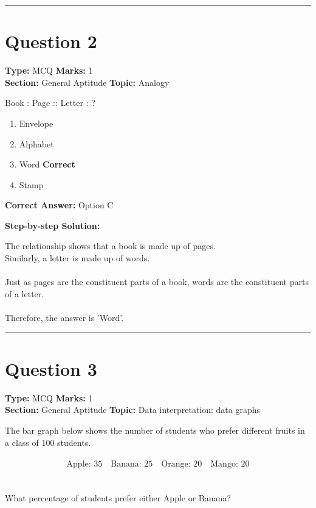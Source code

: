 \documentclass[11pt]{article}
\begin{document}
\vspace{0.8em}
\hrule
\vspace{0.4em}
\section*{Question 2}
\textbf{Type:} MCQ \hfill \textbf{Marks:} 1\\
\textbf{Section:} General Aptitude \hfill \textbf{Topic:} Analogy

Book : Page :: Letter : ?


\begin{enumerate}[label=\textbf{\Alph*.}, leftmargin=1.8em]
\item Envelope\item Alphabet\item Word \hfill {\color{gategreen}\textbf{Correct}}\item Stamp\end{enumerate}

\textbf{Correct Answer:} Option C

\textbf{Step-by-step Solution:}

The relationship shows that a book is made up of pages.\\
 Similarly, a letter is made up of words.\\
\\
 Just as pages are the constituent parts of a book, words are the constituent parts of a letter.\\
\\
 Therefore, the answer is 'Word'.

\vspace{0.8em}
\hrule
\vspace{0.4em}
\section*{Question 3}
\textbf{Type:} MCQ \hfill \textbf{Marks:} 1\\
\textbf{Section:} General Aptitude \hfill \textbf{Topic:} Data interpretation: data graphs

The bar graph below shows the number of students who prefer different fruits in a class of 100 students.\\
\\
\[\text{Apple: } 35 \quad \text{Banana: } 25 \quad \text{Orange: } 20 \quad \text{Mango: } 20\]\\
\\
What percentage of students prefer either Apple or Banana?
\end{document}

